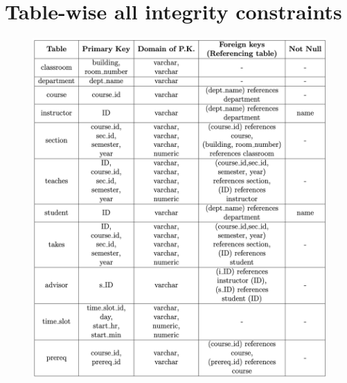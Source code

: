 \documentclass[12pt]{article}
\begin{document}
\begin{titlingpage}
\maketitle
\end{titlingpage}

\newpage

\section{Table-wise all integrity constraints}
\begin{figure}[!hbt]
    \centering
    \includegraphics[scale=0.68]{screenshots/table_1.png}
    \label{fig:my_label1}
    \caption{}
\end{figure}


 
\end{document}
